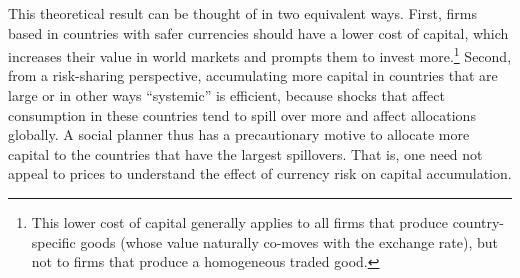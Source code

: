 \documentclass[11pt]{article}
\begin{document}
This theoretical result can be thought of in two equivalent ways. First, firms based in countries with safer currencies should have a lower cost of capital, which increases their value in world markets and prompts them to invest more.\footnote{This lower cost of capital generally applies to all firms that produce country-specific goods (whose value naturally co-moves with the exchange rate), but not to firms that produce a homogeneous traded good.} Second, from a risk-sharing perspective, accumulating more capital in countries that are large or in other ways ``systemic'' is efficient, because shocks that affect consumption in these countries tend to spill over more and affect allocations globally. A social planner thus has a precautionary motive to allocate more capital to the countries that have the largest spillovers. That is, one need not appeal to prices to understand the effect of currency risk on capital accumulation.

\end{document}
